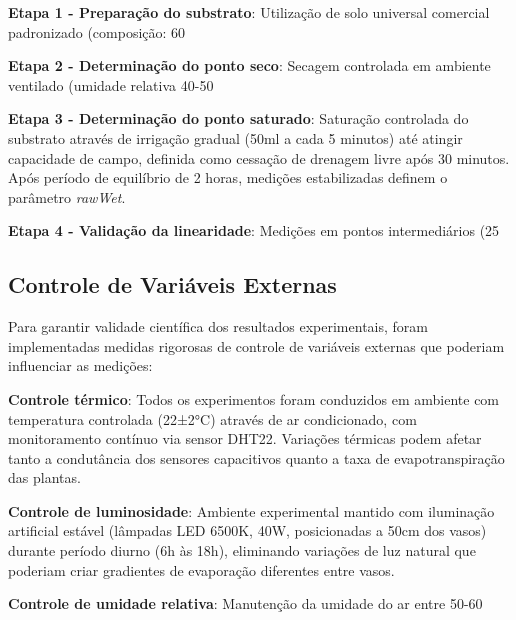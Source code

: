 \textbf{Etapa 1 - Preparação do substrato}: Utilização de solo universal comercial padronizado (composição: 60%

\textbf{Etapa 2 - Determinação do ponto seco}: Secagem controlada em ambiente ventilado (umidade relativa 40-50%

\textbf{Etapa 3 - Determinação do ponto saturado}: Saturação controlada do substrato através de irrigação gradual (50ml a cada 5 minutos) até atingir capacidade de campo, definida como cessação de drenagem livre após 30 minutos. Após período de equilíbrio de 2 horas, medições estabilizadas definem o parâmetro \textit{rawWet}.

\textbf{Etapa 4 - Validação da linearidade}: Medições em pontos intermediários (25%

\subsection{Controle de Variáveis Externas}

Para garantir validade científica dos resultados experimentais, foram implementadas medidas rigorosas de controle de variáveis externas que poderiam influenciar as medições:

\textbf{Controle térmico}: Todos os experimentos foram conduzidos em ambiente com temperatura controlada (22±2°C) através de ar condicionado, com monitoramento contínuo via sensor DHT22. Variações térmicas podem afetar tanto a condutância dos sensores capacitivos quanto a taxa de evapotranspiração das plantas.

\textbf{Controle de luminosidade}: Ambiente experimental mantido com iluminação artificial estável (lâmpadas LED 6500K, 40W, posicionadas a 50cm dos vasos) durante período diurno (6h às 18h), eliminando variações de luz natural que poderiam criar gradientes de evaporação diferentes entre vasos.

\textbf{Controle de umidade relativa}: Manutenção da umidade do ar entre 50-60%

